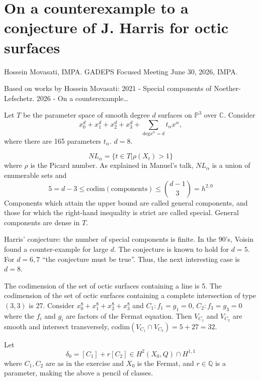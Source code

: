 \section{On a counterexample to a conjecture
of J. Harris for octic surfaces}
\label{section-counterexample-harris-conj}

\noindent
Hossein Movasati, IMPA.
GADEPS Focused Meeting June 30, 2026, IMPA.

\medskip\noindent
Based on works by Hossein Movasati:
2021 - Special components of
Noether-Lefschetz. 2026 - On a
counterexample…

\medskip\noindent
Let $T $ be the parameter space of smooth
degree $d$ surfaces on $\mathbb{P}^3$ over
$\mathbb{C}$.
Consider
$$
x_0^d+x_1^d+x_2^d+x_3^d
+\sum_{\text{deg}x^\alpha =d}t_\alpha
x^\alpha,
$$
where there are 165 parameters $t_\alpha$.
$d=8$.

$$
NL_\alpha
=
\{t \in T|\rho(X_t)>1\}
$$
where $\rho$ is the Picard number.
As explained in Manuel's talk,
$NL_\alpha$ is a union of enumerable
sets and
$$
5=d-3 \leq  \text{codim}(\text{components} )
\leq \binom{d-1}{3}=h^{2,0}
$$
Components which attain the upper bound
are called general components, and those
for which the right-hand inequality
is strict are called special.
General components are dense in $T$.

Harris' conjecture: the number of special
components is finite.
In the 90's, Voisin found a counter-example
for large $d$.
The conjecture is known to hold
for $d=5$. For $d=6,7$ ``the conjecture
must be true''. Thus, the next interesting
case is $d=8$.

\begin{exercise}
\label{exercise-computation-codim}
The codimension of the set of octic
surfaces containing a line is 5.
The codimension of the set of octic surfaces
containing a complete intersection
of type $(3,3)$ is 27.
Consider $x_0^8+x_1^8+x_2^8+x_3^8$
and $C_1:f_1=g_1=0$, $C_2:f_3=g_3=0$ where
the $f_i$ and $g_i$ are factors
of the Fermat equation. Then $V_{C_1}$
and $V_{C_2}$ are smooth and intersect
transversely, $\text{codim}(V_{C_1}\cap
V_{C_2})=5+27=32$.
\end{exercise}

\noindent
Let
$$
\delta_0=[C_1]+r[C_2]
\in H^2(X_0,Q) \cap H^{1,1} 
$$
where $C_1,C_2$ are as in the
exercise and $X_0$ is the Fermat,
and $r \in \mathbb{Q}$ is a parameter,
making the above a pencil of classes. 

